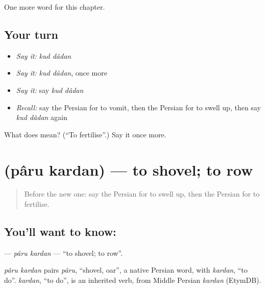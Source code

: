 \begin{grammarlens}[title={What you've built}]
One more word for this chapter.
\end{grammarlens}

\subsection*{Your turn}
\begin{itemize}
\raggedright
  \item \emph{Say it:} \emph{kud dâdan}
  \item \emph{Say it:} \emph{kud dâdan}, once more
  \item \emph{Say it:} say \emph{kud dâdan}
  \item \emph{Recall:} say the Persian for to vomit, then the Persian for to swell up, then say \emph{kud dâdan} again
\end{itemize}

\begin{tcolorbox}[breakable,colback=teal!4,colframe=teal!35!black,title={Before you move on}]
What does   mean? (\textquotedblleft{}To fertilise\textquotedblright{}.) Say it once more.
\end{tcolorbox}
\section[\texorpdfstring{\fa{پارو} \fa{کردن} (pâru kardan)}{پارو کردن (pâru kardan)}]{  (pâru kardan) — to shovel; to row}

\label{lesson:FA-C226-paru-kardan}



\begin{quote}
Before the new one: say the Persian for to swell up, then the Persian for to fertilise.
\end{quote}

\subsection*{You'll want to know:  }
\textbf{ } — \emph{pâru kardan} — \textquotedblleft{}to shovel; to row\textquotedblright{}.

\begin{cousinweb}
\emph{pâru kardan} pairs \emph{pâru}, \textquotedblleft{}shovel, oar\textquotedblright{}, a native Persian word, with \emph{kardan}, \textquotedblleft{}to do\textquotedblright{}. \emph{kardan}, \textquotedblleft{}to do\textquotedblright{}, is an inherited verb, from Middle Persian \emph{kardan} (EtymDB).
\end{cousinweb}

